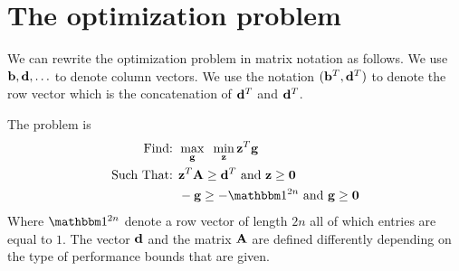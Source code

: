 \documentclass{article}[12pt]
\begin{document}
\section{The optimization problem}

We can rewrite the optimization problem in matrix notation as follows.
We use $\mathbf{b},\mathbf{d},\ldots$ to denote column vectors.  We use the notation
$(\mathbf{b}^T,\mathbf{d}^T)$ to denote the row vector which is the concatenation of
$\mathbf{d}^T$ and $\mathbf{d}^T$.

The problem is
\begin{eqnarray}
\mbox{Find: }&\max_{\vg} \;\; \min_{\vz} \vz^T \vg \label{max-min-prog}\\
\mbox{Such That: }& \vz^T \vA \geq \vd^T \mbox{ and } 
\vz \geq \vzero \notag \\
& -\vg \geq -\ones{2n} \mbox{ and } \vg \geq \vzero \notag
\end{eqnarray}
Where $\ones{2n}$ denote a row vector of length $2n$ all of which
entries are equal to $1$. The vector $\mathbf{d}$ and the matrix $\mathbf{A}$ are
defined differently depending on the type of performance bounds that
are given.
\end{document}
